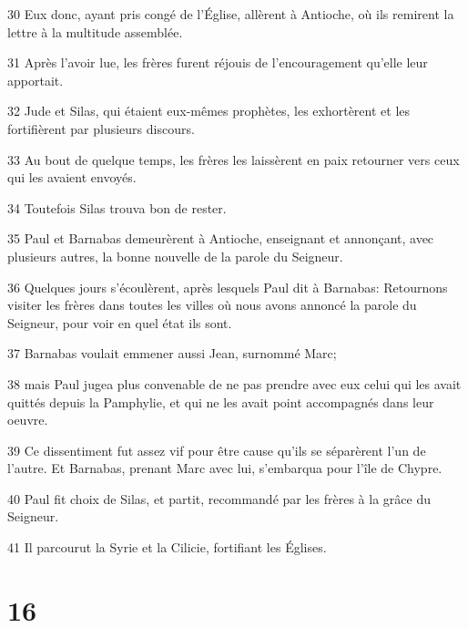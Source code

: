 \par 30 Eux donc, ayant pris congé de l'Église, allèrent à Antioche, où ils remirent la lettre à la multitude assemblée.
\par 31 Après l'avoir lue, les frères furent réjouis de l'encouragement qu'elle leur apportait.
\par 32 Jude et Silas, qui étaient eux-mêmes prophètes, les exhortèrent et les fortifièrent par plusieurs discours.
\par 33 Au bout de quelque temps, les frères les laissèrent en paix retourner vers ceux qui les avaient envoyés.
\par 34 Toutefois Silas trouva bon de rester.
\par 35 Paul et Barnabas demeurèrent à Antioche, enseignant et annonçant, avec plusieurs autres, la bonne nouvelle de la parole du Seigneur.
\par 36 Quelques jours s'écoulèrent, après lesquels Paul dit à Barnabas: Retournons visiter les frères dans toutes les villes où nous avons annoncé la parole du Seigneur, pour voir en quel état ils sont.
\par 37 Barnabas voulait emmener aussi Jean, surnommé Marc;
\par 38 mais Paul jugea plus convenable de ne pas prendre avec eux celui qui les avait quittés depuis la Pamphylie, et qui ne les avait point accompagnés dans leur oeuvre.
\par 39 Ce dissentiment fut assez vif pour être cause qu'ils se séparèrent l'un de l'autre. Et Barnabas, prenant Marc avec lui, s'embarqua pour l'île de Chypre.
\par 40 Paul fit choix de Silas, et partit, recommandé par les frères à la grâce du Seigneur.
\par 41 Il parcourut la Syrie et la Cilicie, fortifiant les Églises.

\chapter{16}

